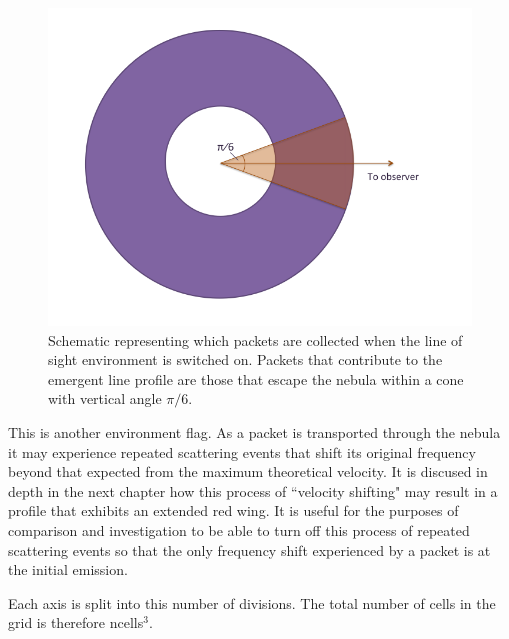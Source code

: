  
 \begin{figure}
 \centering
 \includegraphics[scale=0.55, trim=-25mm 10mm 29mm 0mm]{chapters/chapter2/LoS_diagram.png}
 \caption{Schematic representing which packets are collected when the line of sight environment is switched on.  Packets that contribute to the emergent line profile are those that escape the nebula within a cone with vertical angle $\pi/6$.}
 \label{fig:LOS}
 \end{figure}
 

 This is another environment flag.  As a packet is transported through the nebula it may experience repeated scattering events that shift its original frequency beyond that expected from the maximum theoretical velocity.  It is discused in depth in the next chapter how this process of ``velocity shifting" may result in a profile that exhibits an extended red wing.  It is useful for the purposes of comparison and investigation to be able to turn off this process of repeated scattering events so that the only frequency shift experienced by a packet is at the initial emission.




 Each axis is split into this number of divisions.  The total number of cells in the grid is therefore ncells$^3$.



